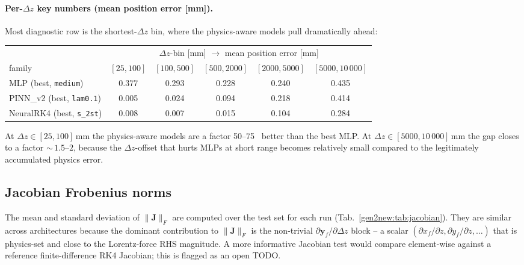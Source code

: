 \documentclass[a4paper,11pt]{article}
\newcommand{\dz}{\Delta z}
\newcommand{\state}{\mathbf{y}}
\newcommand{\Jac}{\mathbf{J}}
\begin{document}
\paragraph{Per-$\Delta z$ key numbers (mean position error [mm]).}
Most diagnostic row is the shortest-$\Delta z$ bin, where the
physics-aware models pull dramatically ahead:
\begin{center}\small
\begin{tabular}{lccccc}
\toprule
 & \multicolumn{5}{c}{$\Delta z$-bin [mm] $\to$ mean position error [mm]} \\
family & $[25,100]$ & $[100,500]$ & $[500,2000]$ & $[2000,5000]$ & $[5000,10\,000]$ \\
\midrule
MLP (best, \texttt{medium})       & 0.377 & 0.293 & 0.228 & 0.240 & 0.435 \\
PINN\_v2 (best, \texttt{lam0.1})  & 0.005 & 0.024 & 0.094 & 0.218 & 0.414 \\
NeuralRK4 (best, \texttt{s\_2st}) & 0.008 & 0.007 & 0.015 & 0.104 & 0.284 \\
\bottomrule
\end{tabular}
\end{center}

At $\Delta z\in[25,100]$\,mm the physics-aware models are a factor
50--75~ better than the best MLP. At
$\Delta z\in[5000,10\,000]$\,mm the gap closes to a factor
${\sim}\,1.5$--$2$, because the $\Delta z$-offset that hurts MLPs at
short range becomes relatively small compared to the legitimately
accumulated physics error.



\subsection{Jacobian Frobenius norms}

The mean and standard deviation of $\|\Jac\|_F$ are computed over
the test set for each run
(Tab.~\ref{gen2new:tab:jacobian}). They are similar across
architectures because the dominant contribution to
$\|\Jac\|_F$ is the non-trivial $\partial\state_f/\partial\dz$ block
-- a scalar $(\partial x_f/\partial z, \partial y_f/\partial z,\dots)$
that is physics-set and close to the Lorentz-force RHS magnitude.
A more informative Jacobian test would compare element-wise against a
reference finite-difference RK4 Jacobian; this is flagged as an
open TODO.
\end{document}
